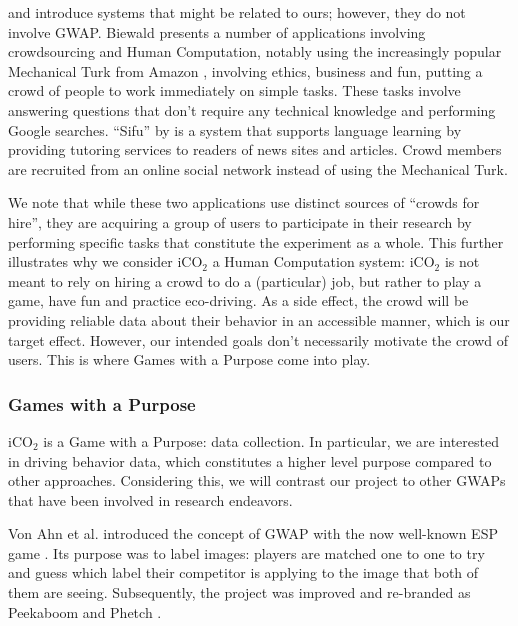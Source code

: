 \documentclass[preprint,authoryear,12pt]{elsarticle}
\makeatletter
\renewcommand{\paragraph}{\@startsection{paragraph}{4}{\z@}%
  {-3.25ex\@plus -1ex \@minus -.2ex}%
  {1.5ex \@plus .2ex}%
  {\normalfont\normalsize\mdseries}}
\makeatother
\begin{document}
\cite{Biewald:2012} and \citep{ChanH12} introduce systems that might be related to ours; however, they do not involve GWAP. Biewald presents a number of applications involving crowdsourcing and Human Computation, notably using the increasingly popular Mechanical Turk from Amazon \citep{MechTurk}, involving ethics, business and fun, putting a crowd of people to work immediately on simple tasks. These tasks involve answering questions that don't require any technical knowledge and performing Google searches. ``Sifu'' by \citep{ChanH12} is a system that supports language learning by providing tutoring services to readers of news sites and articles. Crowd members are recruited from an online social network instead of using the Mechanical Turk.

We note that while these two applications use distinct sources of ``crowds for hire'', they are acquiring a group of users to participate in their research by performing specific tasks that constitute the experiment as a whole. This further illustrates why we consider iCO$_2$ a Human Computation system: iCO$_2$ is not meant to rely on hiring a crowd to do a (particular) job, but rather to play a game, have fun and practice eco-driving. As a side effect, the crowd will be providing reliable data about their behavior in an accessible manner, which is our target effect. However, our intended goals don't necessarily motivate the crowd of users. This is where Games with a Purpose come into play.

\subsubsection{Games with a Purpose}

iCO$_2$ is a Game with a Purpose: data collection. In particular, we are interested in driving behavior data, which constitutes a higher level purpose compared to other approaches. Considering this, we will contrast our project to other GWAPs that have been involved in research endeavors.


Von Ahn et al. introduced the concept of GWAP with the now well-known ESP game \citep{vonAhn:2004}. Its purpose was to label images: players are matched one to one to try and guess which label their competitor is applying to the image that both of them are seeing. Subsequently, the project was improved and re-branded as Peekaboom \citep{vonAhn:2006} and Phetch \citep{vonAhn:2007}.
\end{document}
